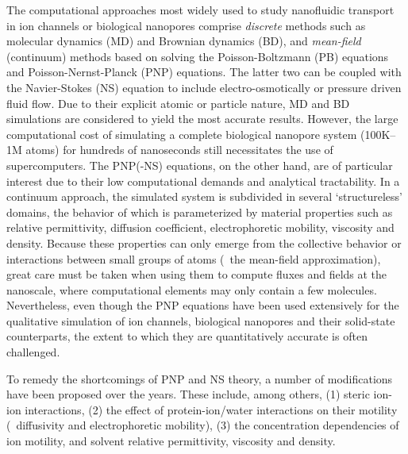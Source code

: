 \documentclass[journal=ancac3,manuscript=article,etalmode=truncate,maxauthors=0,layout=onecolumn]{achemso}
\begin{document}
The computational approaches most widely used to study nanofluidic transport in ion channels or biological
nanopores comprise \emph{discrete} methods such as molecular dynamics
(MD)\cite{Lynden-Bell-1996,Allen-1999,Aksimentiev-2005,Luan-2008,Bhattacharya-2011,Zhang-2014,DiMarino-2015,Belkin-2016}
and Brownian dynamics
(BD),\cite{Schirmer-1999,Im-2002,Noskov-2004,Millar-2008,Egwolf-2010,DeBiase-2015,Pederson-2015} and
\emph{mean-field} (continuum) methods based on solving the Poisson-Boltzmann (PB)
equations\cite{Grochowski-2008, Baldessari-2008-1} and Poisson-Nernst-Planck (PNP)
equations.\cite{Eisenberg-1996,Gillespie-2002, Simakov-2010} The latter two can be coupled with the
Navier-Stokes (NS) equation to include electro-osmotically or pressure driven fluid
flow.\cite{Lu-2012,Pederson-2015} Due to their explicit atomic or particle nature, MD and BD simulations are
considered to yield the most accurate results. However, the large computational cost of simulating a complete
biological nanopore system (100K--1M atoms) for hundreds of nanoseconds still necessitates the use of
supercomputers.\cite{Aksimentiev-2005,Bhattacharya-2011,Wilson-2019} The PNP(-NS) equations, on the other
hand, are of particular interest due to their low computational demands and analytical tractability. In a
continuum approach, the simulated system is subdivided in several `structureless' domains, the behavior of
which is parameterized by material properties such as relative permittivity, diffusion coefficient,
electrophoretic mobility, viscosity and density. Because these properties can only emerge from the collective
behavior or interactions between small groups of atoms (\ie~the mean-field approximation), great care must be
taken when using them to compute fluxes and fields at the nanoscale, where computational elements may only
contain a few molecules.\cite{Corry-2000,Collins-2012} Nevertheless, even though the PNP equations have been
used extensively for the qualitative simulation of ion channels,\cite{Im-2002,Furini-2006,Liu-2015} biological
nanopores\cite{Simakov-2010,Pederson-2015,Aguilella-Arzo-2017,Simakov-2018} and their solid-state
counterparts,\cite{Cervera-2005,White-2008,Chaudhry-2014,Laohakunakorn-2015} the extent to which they are
quantitatively accurate is often challenged.\cite{Corry-2000,Collins-2012,Maffeo-2012,Thomas-2014,Kim-2015}

To remedy the shortcomings of PNP and NS theory, a number of modifications have been proposed over the years.
These include, among others, (1) steric ion-ion interactions, (2) the effect of protein-ion/water interactions
on their motility (\ie~diffusivity and electrophoretic mobility), (3) the concentration dependencies of ion
motility, and solvent relative permittivity, viscosity and density.
\end{document}
